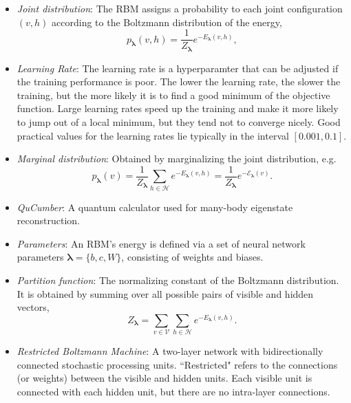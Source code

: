 \documentclass[submission, Phys]{SciPost}
\begin{document}
\begin{itemize}
	\item {\it Joint distribution}: The RBM assigns a probability to each joint configuration $(v,h)$ according to the Boltzmann distribution of the energy,
	      \begin{equation}
		      p_{\bm{\lambda}}(v,h) = \frac{1}{Z_{\bm{\lambda}}} e^{-E_{\bm{\lambda}}(v,h)},
	      \end{equation}

\item{\it Learning Rate}: The learning rate is a hyperparamter that can be adjusted if the training performance is poor.
The lower the learning rate, the slower the training, but the more likely it is to find a good minimum of the objective function.
Large learning rates speed up the training and make it more likely to jump out of a local minimum, but they tend not to converge nicely.
Good practical values for the learning rates lie typically in the interval $[0.001, 0.1]$.


	\item {\it Marginal distribution}: Obtained by marginalizing the joint distribution, e.g.
	      \begin{equation}
		      \label{Eq:marginal_distribution}
		      p_{\bm{\lambda}}(v) = \frac{1}{Z_{\bm{\lambda}}} \sum\limits_{h\in \mathcal{H}} e^{-E_{\bm{\lambda}}(v,h)} = \frac{1}{Z_{\bm{\lambda}}} e^{- \mathcal{E}_{\bm{\lambda}}(v)}.
	      \end{equation}

	\item {\it QuCumber}: A quantum calculator used for many-body eigenstate reconstruction.

	\item {\it Parameters}: An RBM's energy is defined via a set of neural network parameters $\bm{\lambda} = \{b,c,W\}$, consisting of weights and biases.

	\item {\it Partition function}: The normalizing constant of the Boltzmann distribution. It is obtained by summing over all possible pairs of visible and hidden vectors,
	      \begin{equation}
		      Z_{\bm{\lambda}} = \sum\limits_{v\in \mathcal{V}}\sum\limits_{h\in \mathcal{H}} e^{-E_{\bm{\lambda}}(v,h)}.
	      \end{equation}

	\item {\it Restricted Boltzmann Machine}: A two-layer network with bidirectionally connected stochastic processing units. ``Restricted" refers to the connections (or weights) between the visible and hidden units. Each visible unit is connected with each hidden unit, but there are no intra-layer connections.


\end{itemize}
\end{document}
